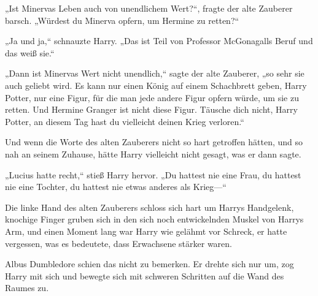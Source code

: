 „Ist Minervas Leben auch von unendlichem Wert?“, fragte der alte Zauberer barsch. „Würdest du Minerva opfern, um Hermine zu retten?“

„Ja und ja,“ schnauzte Harry. „Das ist Teil von Professor McGonagalls Beruf und das weiß sie.“

„Dann ist Minervas Wert nicht unendlich,“ sagte der alte Zauberer, „so sehr sie auch geliebt wird. Es kann nur einen König auf einem Schachbrett geben, Harry Potter, nur eine Figur, für die man jede andere Figur opfern würde, um sie zu retten. Und Hermine Granger ist nicht diese Figur. Täusche dich nicht, Harry Potter, an diesem Tag hast du vielleicht deinen Krieg verloren.“

Und wenn die Worte des alten Zauberers nicht so hart getroffen hätten, und so nah an seinem Zuhause, hätte Harry vielleicht nicht gesagt, was er dann sagte.

„Lucius hatte recht,“ stieß Harry hervor. „Du hattest nie eine Frau, du hattest nie eine Tochter, du hattest nie etwas anderes als Krieg—“

Die linke Hand des alten Zauberers schloss sich hart um Harrys Handgelenk, knochige Finger gruben sich in den sich noch entwickelnden Muskel von Harrys Arm, und einen Moment lang war Harry wie gelähmt vor Schreck, er hatte vergessen, was es bedeutete, dass Erwachsene stärker waren.

Albus Dumbledore schien das nicht zu bemerken. Er drehte sich nur um, zog Harry mit sich und bewegte sich mit schweren Schritten auf die Wand des Raumes zu.

